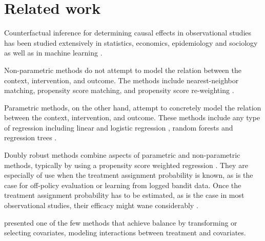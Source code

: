 \section{Related work}

Counterfactual inference for determining causal effects  in observational studies has been studied extensively in statistics, economics, epidemiology and sociology \citep{morgan2014counterfactuals,robins2000marginal,rubin2011causal,chernozhukov2013inference} as well as in machine learning \citep{langford2011doubly,bottou2013counterfactual,swaminathan2015batch}.


Non-parametric methods do not attempt to model the relation between the context, intervention, and outcome. The methods include nearest-neighbor matching, propensity score matching, and propensity score re-weighting \citep{rosenbaum1983central, rosenbaum2002observational,austin2011introduction}.

Parametric methods, on the other hand, attempt to concretely model the relation between the context, intervention, and outcome. These methods include any type of regression including linear and logistic regression \citep{prentice1976use,gelman2006data}, random forests \citep{wager2015estimation}  and regression trees \citep{chipman2010bart}.

Doubly robust methods combine aspects of parametric and non-parametric methods, typically by using a propensity score weighted regression \citep{bang2005doubly,dudik2011doubly}. They are especially of use when the treatment assignment probability is known, as is the case for off-policy evaluation or learning from logged bandit data. Once the treatment assignment probability has to be estimated, as is the case in most observational studies, their efficacy might wane considerably \citep{kang2007demystifying}.

\citet{tian2014simple} presented one of the few methods that achieve balance by transforming or selecting covariates, modeling  interactions between treatment and covariates.

